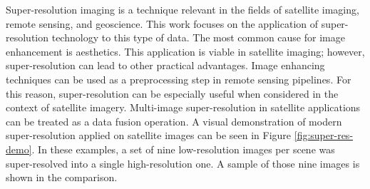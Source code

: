 Super-resolution imaging is a technique relevant in the fields of satellite imaging,
remote sensing, and geoscience.
This work focuses on the application of super-resolution technology to this type of data.
The most common cause for image enhancement is aesthetics.
This application is viable in satellite imaging; however, super-resolution can
lead to other practical advantages.
Image enhancing techniques can be used as a preprocessing step in remote
sensing pipelines.
For this reason, super-resolution can be especially useful when considered in
the context of satellite imagery.
Multi-image super-resolution in satellite applications can be treated as a data fusion operation.
A visual demonstration of modern super-resolution applied on satellite images can be seen in Figure \ref{fig:super-res-demo}.
In these examples, a set of nine low-resolution images per scene was super-resolved into a single high-resolution one.
A sample of those nine images is shown in the comparison.
